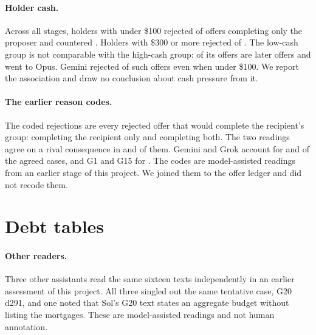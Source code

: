 \paragraph{Holder cash.}
Across all stages, holders with under \$100 rejected  of  offers completing only the proposer and countered . Holders with \$300 or more rejected  of . The low-cash group is not comparable with the high-cash group:  of its  offers are later offers and  went to Opus. Gemini rejected  of  such offers even when under \$100. We report the association and draw no conclusion about cash pressure from it.

\paragraph{The earlier reason codes.}
The  coded rejections are every rejected offer that would complete the recipient's group:  completing the recipient only and  completing both. The two readings agree on a rival consequence in  and  of them. Gemini and Grok account for  and  of the  agreed cases, and G1 and G15 for . The codes are model-assisted readings from an earlier stage of this project. We joined them to the offer ledger and did not recode them.

\section{Debt tables}
\label{app:debts}

\TableSixteenQuotes

\paragraph{Other readers.}
Three other assistants read the same sixteen texts independently in an earlier assessment of this project. All three singled out the same tentative case, G20 d291, and one noted that Sol's G20 text states an aggregate budget without listing the mortgages. These are model-assisted readings and not human annotation.

